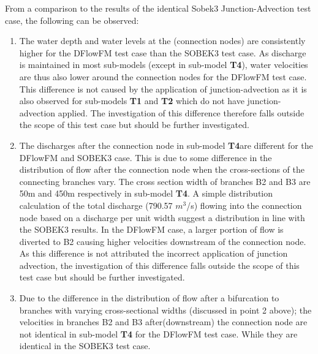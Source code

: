 From a comparison to the results of the identical Sobek3 Junction-Advection test case, the following can be observed:
\begin{enumerate}

	\item The water depth and water levels at the (connection nodes) are consistently higher for the DFlowFM test case than the SOBEK3 test case. As discharge is maintained in most sub-models (except in sub-model \textbf{\textcolor[rgb]{1,0,0}{T4}}), water velocities are thus also lower around the connection nodes for the DFlowFM test case. This difference is not caused by the application of junction-advection as it is also observed for sub-models \textbf{\textcolor[rgb]{1,0,0}{T1}} and \textbf{\textcolor[rgb]{1,0,0}{T2}} which do not have junction-advection applied. The investigation of this difference therefore falls outside the scope of this test case but should be further investigated. \newline
	
	\item The discharges after the connection node in sub-model \textbf{\textcolor[rgb]{1,0,0}{T4}}are different for the DFlowFM and SOBEK3 case. This is due to some difference in the distribution of flow after the connection node when the cross-sections of the connecting branches vary. The cross section width of branches B2 and B3 are 50m and 450m respectively in sub-model \textbf{\textcolor[rgb]{1,0,0}{T4}}. A simple distribution calculation of the total discharge (790.57 $m^{3}$/s) flowing into the connection node based on a discharge per unit width suggest a distribution in line with the SOBEK3 results. In the DFlowFM case, a larger portion of flow is diverted to B2 causing higher velocities downstream of the connection node. As this difference is not attributed the incorrect application of junction advection, the investigation of this difference falls outside the scope of this test case but should be further investigated. \newline
	
	\item Due to the difference in the distribution of flow after a bifurcation to  branches with varying cross-sectional widths (discussed in point 2 above); the velocities in branches B2 and B3 after(downstream) the connection node are not identical in sub-model \textbf{\textcolor[rgb]{1,0,0}{T4}} for the DFlowFM test case. While they are identical in the SOBEK3 test case. \newline

\end{enumerate}
	
